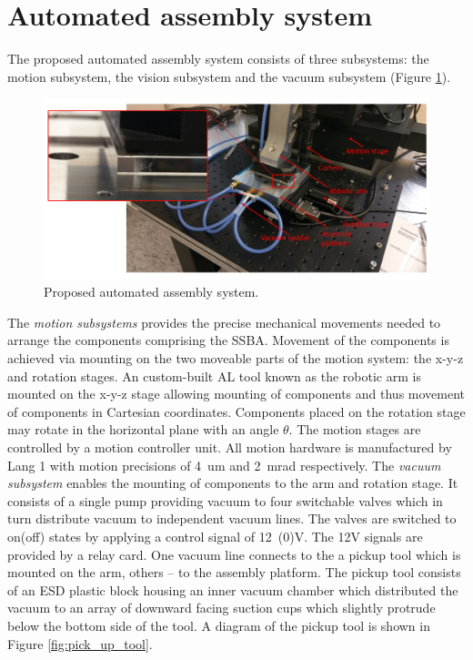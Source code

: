 \section{Automated assembly system}

The proposed automated assembly system consists of three subsystems: the motion subsystem, the vision subsystem and the vacuum subsystem (Figure \ref{fig:auto_assembly_system})\cite{AutomatedAssembly_tutorial}.

\begin{figure}[ht]\centering
\includegraphics[width=1\linewidth]{Data/Module_assembly/Automated_assembly_system.png}
\caption{Proposed automated assembly system.}
\label{fig:auto_assembly_system}
\end{figure}

The \emph{motion subsystems} provides the precise mechanical movements needed to arrange the components comprising the SSBA. Movement of the components is achieved via mounting on the two moveable parts of the motion system: the x-y-z and rotation stages. An custom-built AL tool known as the robotic arm is mounted on the x-y-z stage allowing mounting of components and thus movement of components in Cartesian coordinates. Components placed on the rotation stage may rotate in the horizontal plane with an angle $\theta$. The motion stages are controlled by a motion controller unit. All motion hardware is manufactured by Lang 1 with motion precisions of 4~um and 2~mrad respectively. The \emph{vacuum subsystem} enables the mounting of components to the arm and rotation stage. It consists of a single pump providing vacuum to four switchable valves which in turn distribute vacuum to independent vacuum lines. The valves are switched to on(off) states by applying a control signal of 12~(0)V. The 12V signals are provided by a relay card. One vacuum line connects to the a pickup tool which is mounted on the arm, others -- to the assembly platform. The pickup tool consists of an ESD plastic block housing an inner vacuum chamber which distributed the vacuum to an array of downward facing suction cups which slightly protrude below the bottom side of the tool. A diagram of the pickup tool is shown in Figure \ref{fig:pick_up_tool}.

